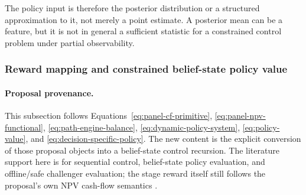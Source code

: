 \documentclass[11pt]{article}
\newcommand{\1}{\mathbf{1}}
\begin{document}
The policy input is therefore the posterior distribution or a structured
approximation to it, not merely a point estimate. A posterior mean can be a
feature, but it is not in general a sufficient statistic for a constrained
control problem under partial observability.

\subsubsection{Reward mapping and constrained belief-state policy value}
\label{subsec:state-space-reward-bellman}

\paragraph{Proposal provenance.}
This subsection follows Equations~\eqref{eq:panel-cf-primitive},
\eqref{eq:panel-npv-functional}, \eqref{eq:path-engine-balance},
\eqref{eq:dynamic-policy-system}, \eqref{eq:policy-value}, and
\eqref{eq:decision-specific-policy}. The new content is the explicit conversion
of those proposal objects into a belief-state control recursion. The literature
support here is for sequential control, belief-state policy evaluation, and
offline/safe challenger evaluation; the stage reward itself still follows the
proposal's own NPV cash-flow semantics
\citep{puterman1994mdp,murphy2003dynamic,smallwood1973pomdp,
kaelbling1998pomdp,jiangli2016dr,huwager2021pomdpope,laroche2019spibb,
khraishiokhrati2022offlinecredit}.
\end{document}
